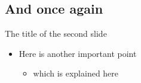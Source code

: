 \subsection{And once again}
\begin{frame}{The title of the second slide}
  \begin{itemize}
    \item Here is another important point
      \begin{itemize}
        \item which is explained here
      \end{itemize}
  \end{itemize}
\end{frame}

